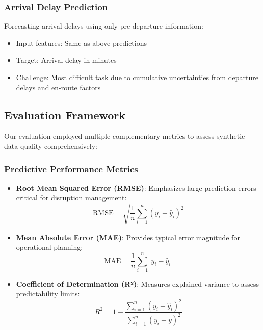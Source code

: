 \documentclass[conference]{IEEEtran}
\begin{document}
\subsubsection{Arrival Delay Prediction}
Forecasting arrival delays using only pre-departure information:
\begin{itemize}
    \item Input features: Same as above predictions
    \item Target: Arrival delay in minutes
    \item Challenge: Most difficult task due to cumulative uncertainties from departure delays and en-route factors
\end{itemize}

\subsection{Evaluation Framework}

Our evaluation employed multiple complementary metrics to assess synthetic data quality comprehensively:

\subsubsection{Predictive Performance Metrics}
\begin{itemize}
    \item \textbf{Root Mean Squared Error (RMSE)}: Emphasizes large prediction errors critical for disruption management:
    \begin{equation}
    \text{RMSE} = \sqrt{\frac{1}{n}\sum_{i=1}^{n}(y_i - \hat{y}_i)^2}
    \end{equation}
    
    \item \textbf{Mean Absolute Error (MAE)}: Provides typical error magnitude for operational planning:
    \begin{equation}
    \text{MAE} = \frac{1}{n}\sum_{i=1}^{n}|y_i - \hat{y}_i|
    \end{equation}
    
    \item \textbf{Coefficient of Determination (R²)}: Measures explained variance to assess predictability limits:
    \begin{equation}
    R^2 = 1 - \frac{\sum_{i=1}^{n}(y_i - \hat{y}_i)^2}{\sum_{i=1}^{n}(y_i - \bar{y})^2}
    \end{equation}
\end{itemize}
\end{document}

